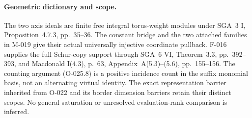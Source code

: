 \paragraph{Geometric dictionary and scope.}
The two axis ideals are finite free integral torus-weight
modules under SGA~3 I, Proposition~4.7.3, pp.~35--36.
The constant bridge and the two attached families in
M-019 give their actual universally injective coordinate
pullback. F-016 supplies the full Schur-copy support
through SGA~6 VI, Theorem~3.3, pp.~392--393, and
Macdonald I(4.3), p.~63, Appendix~A(5.3)--(5.6),
pp.~155--156. The counting argument (O-025.8)
is a positive incidence count in the suffix monomial
basis, not an alternating virtual identity.
The exact representation barrier inherited from O-022
and its border dimension barriers retain their distinct
scopes. No general saturation or unresolved evaluation-rank
comparison is inferred.
